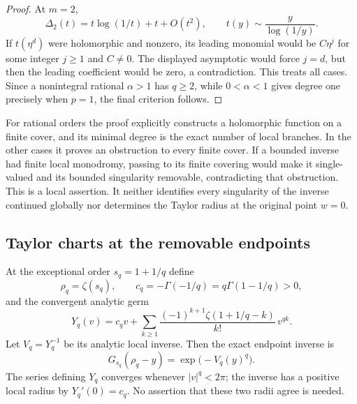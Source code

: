 \begin{proof}
At $m=2$,
\[
 \Delta_2(t)=t\log(1/t)+t+O(t^2),\qquad
 t(y)\sim\frac{y}{\log(1/y)}.
\]
If $t(\eta^d)$ were holomorphic and nonzero, its leading monomial
would be $C\eta^j$ for some integer $j\ge1$ and $C\ne0$.
The displayed asymptotic would force $j=d$, but then the leading
coefficient would be zero, a contradiction. This treats all cases.
Since a nonintegral rational $\alpha>1$ has $q\ge2$, while
$0<\alpha<1$ gives degree one precisely when $p=1$, the final
criterion follows.
\end{proof}

\begin{remark}
For rational orders the proof explicitly constructs a holomorphic
function on a finite cover, and its minimal degree is the exact number
of local branches. In the other cases it proves an obstruction to
every finite cover. If a bounded inverse had finite local monodromy,
passing to its finite covering would make it single-valued and its
bounded singularity removable, contradicting that obstruction.
This is a local assertion. It neither identifies every singularity of
the inverse continued globally nor determines the Taylor radius at
the original point $w=0$.
\end{remark}

\subsection{Taylor charts at the removable endpoints}

At the exceptional order $s_q=1+1/q$ define
\[
 \rho_q=\zeta(s_q),\qquad
 c_q=-\Gamma(-1/q)=q\Gamma(1-1/q)>0,
\]
and the convergent analytic germ
\begin{equation}
 Y_q(v)=c_qv+\sum_{k\ge1}
        \frac{(-1)^{k+1}\zeta(1+1/q-k)}{k!}\,v^{qk}.
 \label{ep:eq:Y}
\end{equation}
Let $V_q=Y_q^{-1}$ be its analytic local inverse. Then the exact
endpoint inverse is
\begin{equation}
 G_{s_q}(\rho_q-y)=\exp\bigl(-V_q(y)^q\bigr).
 \label{ep:eq:exact-chart}
\end{equation}
The series defining $Y_q$ converges whenever $|v|^q<2\pi$;
the inverse has a positive local radius by $Y_q'(0)=c_q$.
No assertion that these two radii agree is needed.

